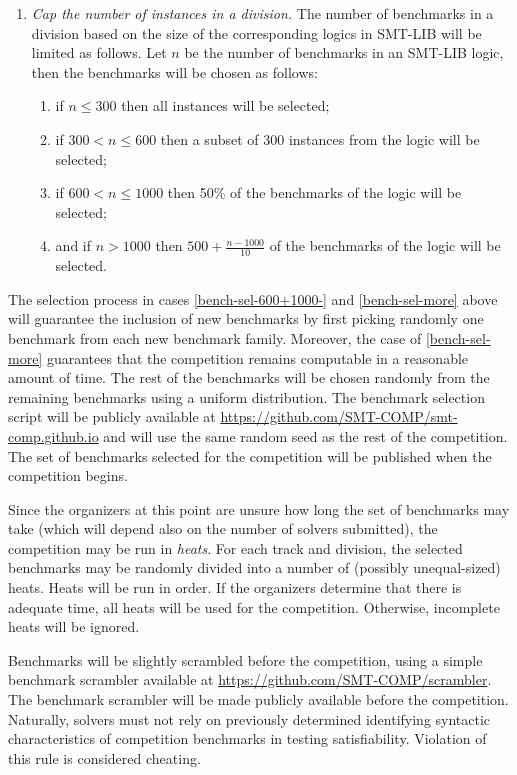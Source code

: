 \documentclass[12pt]{article}
\begin{document}
\begin{enumerate}
\item \emph{Cap the number of instances in a division.}
  The number of benchmarks in a division based on the size of the
  corresponding logics in SMT-LIB will be limited as follows.
  Let $n$ be the number of benchmarks in an SMT-LIB logic, then
  the benchmarks will be chosen as follows:
  \begin{enumerate}
  \vspace{-1ex}
    \item \label{bench-sel-300} if $n \le 300$ then all instances will be selected;
  \item \label{bench-sel-600} if $300 < n \leq 600$ then a subset of 300 instances
    from the logic will be selected;
  \item \label{bench-sel-600+1000-} if $600 < n \leq 1000$ then
      50\% of the benchmarks of the logic will be selected;
  \item and \label{bench-sel-more} if $n > 1000$ then $500 + \frac{n - 1000}{10}$
      of the benchmarks of the logic will be selected.
    \end{enumerate}
\end{enumerate}
%
The selection process in cases \ref{bench-sel-600+1000-} and \ref{bench-sel-more}
above will guarantee the inclusion of new benchmarks by first picking randomly
one benchmark from each new benchmark family. Moreover, the case of
\ref{bench-sel-more} guarantees that the competition remains computable
in a reasonable amount of time. The rest of the benchmarks will be chosen
randomly from the remaining benchmarks using a uniform distribution.
%
The benchmark selection script will be publicly available at
\url{https://github.com/SMT-COMP/smt-comp.github.io} and
will use the same random seed as the rest of the competition.  The set of
benchmarks selected for the competition will be published when the competition
begins.

%
Since the organizers at this point are unsure how long the set of
benchmarks may take (which will depend also on the number of solvers
submitted), the competition may be run in \emph{heats}.  For each
track and division, the selected benchmarks may be randomly divided
into a number of (possibly unequal-sized) heats.  Heats will be run in
order.  If the organizers determine that there is adequate time, all
heats will be used for the competition.  Otherwise, incomplete heats
will be ignored.

%
Benchmarks will be slightly scrambled before the competition, using a simple
benchmark scrambler available at \url{https://github.com/SMT-COMP/scrambler}.
The benchmark scrambler will be made publicly available before the competition.
%
Naturally, solvers must not rely on previously determined identifying
syntactic characteristics of competition benchmarks in testing
satisfiability.  Violation of this rule is considered cheating.
\end{document}
